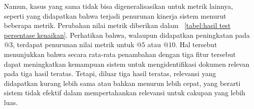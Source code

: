 Namun, kasus yang sama tidak bisa digeneralisasikan untuk metrik lainnya, seperti yang didapatkan bahwa terjadi penurunan kinerja sistem menurut beberapa metrik. Perubahan nilai metrik diberikan dalam \tabel{}~\ref{tabel:hasil test persentase kenaikan}. Perhatikan bahwa, walaupun didapatkan peningkatan pada \recall{}$@3$, terdapat penurunan nilai metrik untuk \recall{}$@5$ atau \recall{}$@10$. Hal tersebut menunjukkan bahwa secara rata-rata penambahan \reranker{} dengan tiga fitur tersebut dapat meningkatkan kemampuan sistem untuk mengidentifikasi dokumen relevan pada tiga hasil teratas. Tetapi, diluar tiga hasil teratas, relevansi yang didapatkan kurang lebih sama atau bahkan menurun lebih cepat, yang berarti sistem tidak efektif dalam mempertahankan relevansi untuk cakupan yang lebih luas.

\begin{table}[H]
    \centering
    \caption{Persentase perubahan metrik pada data \testing{}}
    \label{tabel:hasil test persentase kenaikan}
\end{table}

